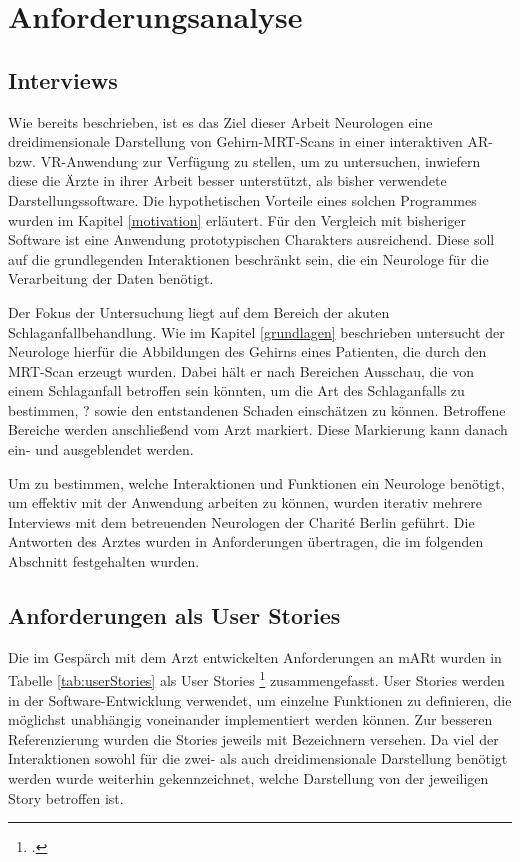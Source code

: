 
\chapter{Anforderungsanalyse}
\label{anforderung}

\section{Interviews}

Wie bereits beschrieben, ist es das Ziel dieser Arbeit Neurologen eine dreidimensionale Darstellung von Gehirn-MRT-Scans in einer interaktiven AR- bzw. VR-Anwendung zur Verfügung zu stellen, um zu untersuchen, inwiefern diese die Ärzte in ihrer Arbeit besser unterstützt, als bisher verwendete Darstellungssoftware. Die hypothetischen Vorteile eines solchen Programmes wurden im Kapitel \ref{motivation} erläutert.
Für den Vergleich mit bisheriger Software ist eine Anwendung prototypischen Charakters ausreichend. Diese soll auf die grundlegenden Interaktionen beschränkt sein, die ein Neurologe für die Verarbeitung der Daten benötigt.

Der Fokus der Untersuchung liegt auf dem Bereich der akuten Schlaganfallbehandlung. Wie im Kapitel \ref{grundlagen} beschrieben untersucht der Neurologe hierfür die Abbildungen des Gehirns eines Patienten, die durch den MRT-Scan erzeugt wurden. Dabei hält er nach Bereichen Ausschau, die von einem Schlaganfall betroffen sein könnten, um die Art des Schlaganfalls zu bestimmen, ? sowie den entstandenen Schaden einschätzen zu können. Betroffene Bereiche werden anschließend vom Arzt markiert. Diese Markierung kann danach ein- und ausgeblendet werden.

Um zu bestimmen, welche Interaktionen und Funktionen ein Neurologe benötigt, um effektiv mit der Anwendung arbeiten zu können, wurden iterativ mehrere Interviews mit dem betreuenden Neurologen der Charité Berlin geführt. Die Antworten des Arztes wurden in Anforderungen übertragen, die im folgenden Abschnitt festgehalten wurden. 

\section{Anforderungen als User Stories}

Die im Gespärch mit dem Arzt entwickelten Anforderungen an mARt wurden in Tabelle \ref{tab:userStories} als User Stories \footcite[vgl. User-Stories nach:][]{UserStoriesApplied} zusammengefasst. 
User Stories werden in der Software-Entwicklung verwendet, um einzelne Funktionen zu definieren, die möglichst unabhängig voneinander implementiert werden können. 
Zur besseren Referenzierung wurden die Stories jeweils mit Bezeichnern versehen. Da viel der Interaktionen sowohl für die zwei- als auch dreidimensionale Darstellung benötigt werden wurde weiterhin gekennzeichnet, welche Darstellung von der jeweiligen Story betroffen ist.

